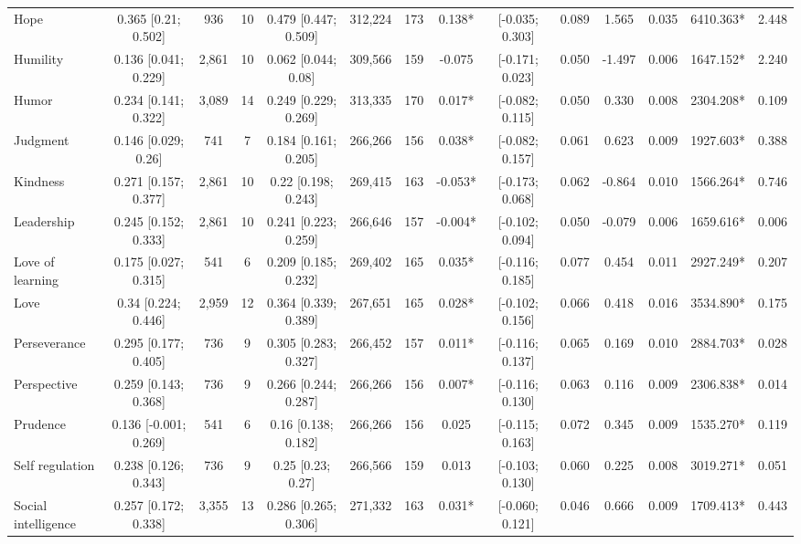 \documentclass[
  man,floatsintext]{apa6}
\begin{document}
\begin{table}
{\begin{tabular}[t]{lccccccccccccc}
Hope & 0.365 [0.21; 0.502] & 936 & 10 & 0.479 [0.447; 0.509] & 312,224 & 173 & 0.138* & {}[-0.035; 0.303] & 0.089 & 1.565 & 0.035 & 6410.363* & 2.448\\
Humility & 0.136 [0.041; 0.229] & 2,861 & 10 & 0.062 [0.044; 0.08] & 309,566 & 159 & -0.075 & {}[-0.171; 0.023] & 0.050 & -1.497 & 0.006 & 1647.152* & 2.240\\
\addlinespace
Humor & 0.234 [0.141; 0.322] & 3,089 & 14 & 0.249 [0.229; 0.269] & 313,335 & 170 & 0.017* & {}[-0.082; 0.115] & 0.050 & 0.330 & 0.008 & 2304.208* & 0.109\\
Judgment & 0.146 [0.029; 0.26] & 741 & 7 & 0.184 [0.161; 0.205] & 266,266 & 156 & 0.038* & {}[-0.082; 0.157] & 0.061 & 0.623 & 0.009 & 1927.603* & 0.388\\
Kindness & 0.271 [0.157; 0.377] & 2,861 & 10 & 0.22 [0.198; 0.243] & 269,415 & 163 & -0.053* & {}[-0.173; 0.068] & 0.062 & -0.864 & 0.010 & 1566.264* & 0.746\\
Leadership & 0.245 [0.152; 0.333] & 2,861 & 10 & 0.241 [0.223; 0.259] & 266,646 & 157 & -0.004* & {}[-0.102; 0.094] & 0.050 & -0.079 & 0.006 & 1659.616* & 0.006\\
Love of learning & 0.175 [0.027; 0.315] & 541 & 6 & 0.209 [0.185; 0.232] & 269,402 & 165 & 0.035* & {}[-0.116; 0.185] & 0.077 & 0.454 & 0.011 & 2927.249* & 0.207\\
\addlinespace
Love & 0.34 [0.224; 0.446] & 2,959 & 12 & 0.364 [0.339; 0.389] & 267,651 & 165 & 0.028* & {}[-0.102; 0.156] & 0.066 & 0.418 & 0.016 & 3534.890* & 0.175\\
Perseverance & 0.295 [0.177; 0.405] & 736 & 9 & 0.305 [0.283; 0.327] & 266,452 & 157 & 0.011* & {}[-0.116; 0.137] & 0.065 & 0.169 & 0.010 & 2884.703* & 0.028\\
Perspective & 0.259 [0.143; 0.368] & 736 & 9 & 0.266 [0.244; 0.287] & 266,266 & 156 & 0.007* & {}[-0.116; 0.130] & 0.063 & 0.116 & 0.009 & 2306.838* & 0.014\\
Prudence & 0.136 [-0.001; 0.269] & 541 & 6 & 0.16 [0.138; 0.182] & 266,266 & 156 & 0.025 & {}[-0.115; 0.163] & 0.072 & 0.345 & 0.009 & 1535.270* & 0.119\\
Self regulation & 0.238 [0.126; 0.343] & 736 & 9 & 0.25 [0.23; 0.27] & 266,566 & 159 & 0.013 & {}[-0.103; 0.130] & 0.060 & 0.225 & 0.008 & 3019.271* & 0.051\\
\addlinespace
Social intelligence & 0.257 [0.172; 0.338] & 3,355 & 13 & 0.286 [0.265; 0.306] & 271,332 & 163 & 0.031* & {}[-0.060; 0.121] & 0.046 & 0.666 & 0.009 & 1709.413* & 0.443\\

\end{tabular}}
\end{table}
\end{document}
